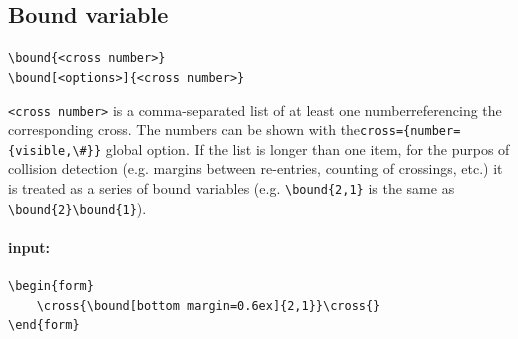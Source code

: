 \documentclass[parskip=half-]{scrartcl}
\begin{document}
\makeatletter
\def\form@print@inject{}
\makeatother

\subsection{Bound variable}
\label{com:bound}

\begin{framed}
\verb|\bound{<cross number>}|\\
\verb|\bound[<options>]{<cross number>}|
\end{framed}

\verb|<cross number>| is a comma-separated list of at least one number\break referencing the corresponding cross. The numbers can be shown with the\break\verb|cross={number={visible,\#}}| global option. If the list is longer than one item, for the purpos of collision detection (e.g. margins between re-entries, counting of crossings, etc.) it is treated as a series of bound variables (e.g. \verb|\bound{2,1}| is the same as \verb|\bound{2}\bound{1}|).

\paragraph{input:}
\begin{verbatim}
\begin{form}
    \cross{\bound[bottom margin=0.6ex]{2,1}}\cross{}
\end{form}
\end{verbatim}

\makeatletter
\def\form@print@inject{
    \put(\dimexpr\form@array@get{form@cross@leftpos}[0]+\form@array@get{form@margin@left}[0],\form@bottom){\scalebox{0.2}{\color{red}\framebox(5\dimexpr\form@array@get{form@bound@width}[0],5\dimexpr\form@array@get{form@bound@height}[0]){}}}
    \put(\dimexpr\form@array@get{form@cross@leftpos}[0]+\form@array@get{form@margin@left}[0]+0.9pt,\dimexpr\form@bottom+\form@array@get{form@bound@height}[0]+0.3pt){\scalebox{0.1}{\color{red}width}}
    \put(\dimexpr\form@array@get{form@cross@leftpos}[0]+\form@array@get{form@margin@left}[0]-3pt,\dimexpr\form@bottom+0.5\dimexpr\form@array@get{form@bound@height}[0]-0.4pt){\scalebox{0.1}{\color{red}height}}
    \put(\dimexpr\form@array@get{form@vert@hpos}[1]-0.5pt,\form@bottom){\scalebox{0.2}{\color{red}\line(0,-1){5\dimexpr\form@array@get{form@margin@vert@bound@top}[1]}}}
    \put(\dimexpr\form@array@get{form@vert@hpos}[1]-0.3pt,\dimexpr\form@bottom-1.6pt){\scalebox{0.1}{\color{red}\parbox{12ex}{bottom margin}}}
    \put(\dimexpr\form@array@get{form@vert@hpos}[0]-0.5pt,\dimexpr\form@bottom+\form@array@get{form@vert@toppos}[0]){\scalebox{0.2}{\color{red}\line(0,1){5\dimexpr\form@array@get{form@bound@multiline@gap}[0]}}}
    \put(\dimexpr\form@array@get{form@vert@hpos}[0]-0.3pt,\dimexpr\form@bottom+\form@array@get{form@vert@toppos}[0]+0.5pt){\scalebox{0.1}{\color{red}multiline gap}}
}
\makeatother
\end{document}
